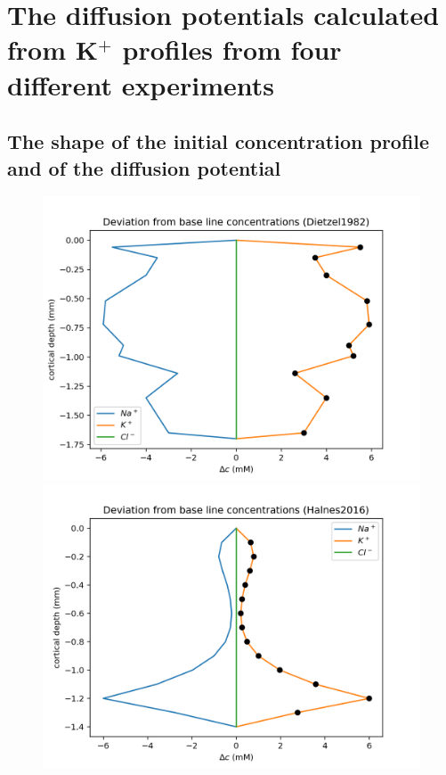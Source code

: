 \documentclass{uiophd}
\begin{document}
 
\section{The diffusion potentials calculated from K$^+$ profiles from four different experiments}\label{diffusion potentials}
\subsection{The shape of the initial concentration profile and of the diffusion potential}\label{c(x,t) and phi(x,t)}

\begin{figure}[!tbp]
  \centering
  \begin{minipage}[b]{0.475\textwidth}
    \includegraphics[width=\textwidth]{Dietzel1982_delta_c.png}
  \end{minipage}
  \hfill
  \begin{minipage}[b]{0.475\textwidth}
    \includegraphics[width=\textwidth]{Halnes2016_delta_c.png}

\end{minipage}
\end{figure}
\end{document}
